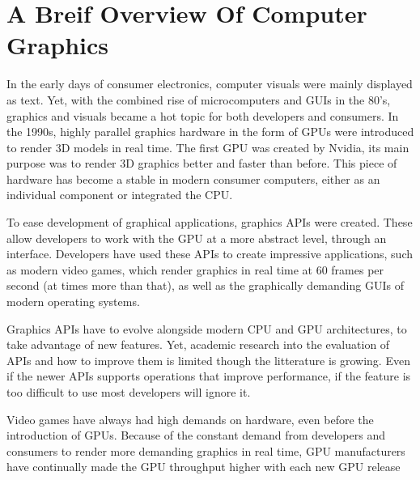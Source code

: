 \section{A Breif Overview Of Computer Graphics}
In the early days of consumer electronics, computer visuals were mainly displayed as text.
Yet, with the combined rise of microcomputers and \glspl{GUI} in the 80's, graphics and visuals became a hot topic for both developers and consumers. 
In the 1990s, highly parallel graphics hardware in the form of \glspl{GPU} were introduced to render 3D models in real time.
The first \gls{GPU} was created by Nvidia, its main purpose was to render 3D graphics better and faster than before. \cite{NvidiaFirstGPU} 
This piece of hardware has become a stable in modern consumer computers, either as an individual component or integrated the CPU.

To ease development of graphical applications, graphics \glspl{API} were created. 
These allow developers to work with the GPU at a more abstract level, through an interface.
Developers have used these \glspl{API} to create impressive applications, such as modern video games, which render graphics in real time at 60 frames per second (at times more than that), as well as the graphically demanding \glspl{GUI} of modern operating systems.

Graphics \glspl{API} have to evolve alongside modern CPU and GPU architectures, to take advantage of new features. 
Yet, academic research into the evaluation of \glspl{API} and how to improve them is limited though the litterature is growing.
Even if the newer \glspl{API} supports operations that improve performance, if the feature is too difficult to use most developers will ignore it.

Video games have always had high demands on hardware, even before the introduction of \glspl{GPU}.
Because of the constant demand from developers and consumers to render more demanding graphics in real time, \gls{GPU} manufacturers have continually made the \gls{GPU} throughput higher with each new \gls{GPU} release

